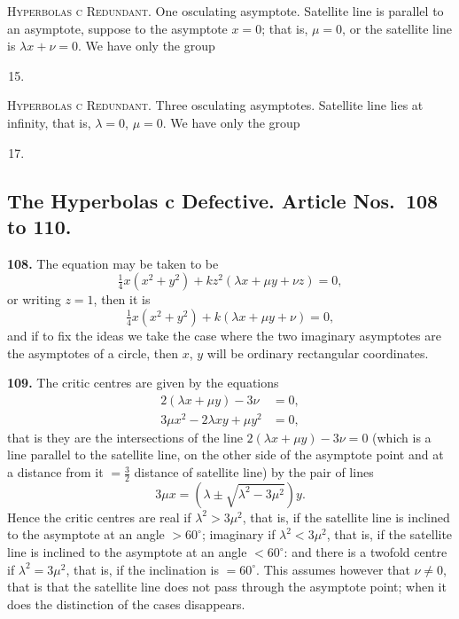 \documentclass[11pt,a4paper]{article}
\theoremstyle{plain}
\begin{document}
\textsc{Hyperbolas c Redundant.} One osculating asymptote. Satellite line is parallel to an asymptote, suppose to the asymptote $x = 0$; that is, $\mu = 0$, or the satellite line is $\lambda x + \nu = 0$. We have only the group
\begin{enumerate}[label=\textsc{\Roman*.},nosep]
\setcounter{enumi}{14}
\item
\end{enumerate}

\textsc{Hyperbolas c Redundant.} Three osculating asymptotes. Satellite line lies at infinity, that is, $\lambda = 0$, $\mu = 0$. We have only the group
\begin{enumerate}[label=\textsc{\Roman*.},nosep]
\setcounter{enumi}{16}
\item
\end{enumerate}

\subsection*{The Hyperbolas c Defective. Article Nos.\ 108 to 110.}

\noindent\textbf{108.} The equation may be taken to be
\[
\tfrac{1}{4}x(x^2 + y^2) + kz^2(\lambda x + \mu y + \nu z) = 0,
\]
or writing $z=1$, then it is
\[
\tfrac{1}{4}x(x^2+y^2) + k(\lambda x + \mu y + \nu) = 0,
\]
and if to fix the ideas we take the case where the two imaginary asymptotes are the asymptotes of a circle, then $x$, $y$ will be ordinary rectangular coordinates.

\noindent\textbf{109.} The critic centres are given by the equations
\begin{align*}
2(\lambda x + \mu y) - 3\nu &= 0,\\
3\mu x^2 - 2\lambda xy + \mu y^2 &= 0,
\end{align*}
that is they are the intersections of the line $2(\lambda x + \mu y) - 3\nu = 0$ (which is a line parallel to the satellite line, on the other side of the asymptote point and at a distance from it $= \tfrac{3}{2}$ distance of satellite line) by the pair of lines
\[
3\mu x = (\lambda \pm \sqrt{\lambda^2 - 3\mu^2})y.
\]
Hence the critic centres are real if $\lambda^2 > 3\mu^2$, that is, if the satellite line is inclined to the asymptote at an angle $> 60^{\circ}$; imaginary if $\lambda^2 < 3\mu^2$, that is, if the satellite line is inclined to the asymptote at an angle $< 60^{\circ}$: and there is a twofold centre if $\lambda^2 = 3\mu^2$, that is, if the inclination is $= 60^{\circ}$. This assumes however that $\nu \neq 0$, that is that the satellite line does not pass through the asymptote point; when it does the distinction of the cases disappears.
\end{document}
